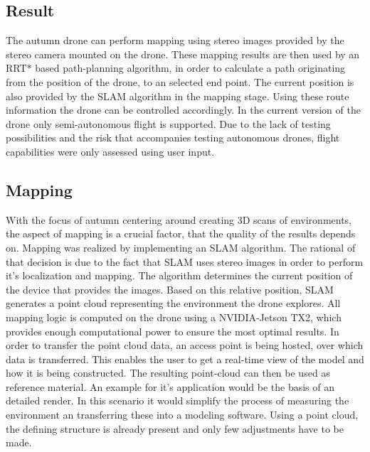 \subsection{Result}
The autumn drone can perform mapping using stereo images provided by the stereo camera mounted on the drone. These mapping results are then used by an RRT* based path-planning algorithm, in order to calculate a path originating from the position of the drone, to an selected end point. The current position is also provided by the SLAM algorithm in the mapping stage. Using these route information the drone can be controlled accordingly.
In the current version of the drone only semi-autonomous flight is supported. Due to the lack of testing possibilities and the risk that accompanies testing autonomous drones, flight capabilities were only assessed using user input.

\subsection{Mapping}
With the focus of autumn centering around creating 3D scans of environments, the aspect of mapping is a crucial factor, that the quality of the results depends on.\newline
Mapping was realized by implementing an SLAM algorithm. The rational of that decision is due to the fact that SLAM uses stereo images in order to perform it's localization and mapping.
The algorithm determines the current position of the device that provides the images. Based on this relative position, SLAM generates a point cloud representing the environment the drone explores. All mapping logic is computed on the drone using a NVIDIA-Jetson TX2, which provides enough computational power to ensure the most optimal results. In order to transfer the point cloud data, an access point is being hosted, over which data is transferred. This enables the user to get a real-time view of the model and how it is being constructed. The resulting point-cloud can then be used as reference material.\newline
An example for it's application would be the basis of an detailed render. In this scenario it would simplify the process of measuring the environment an transferring these into a modeling software. Using a point cloud, the defining structure is already present and only few adjustments have to be made.

